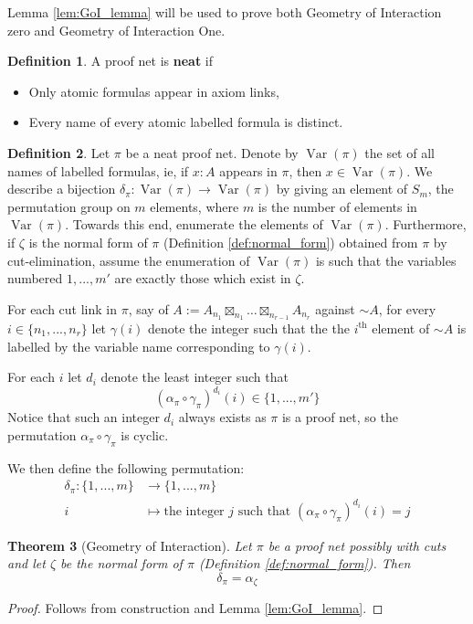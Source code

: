 \documentclass[12pt]{article}
\theoremstyle{plain}
\newtheorem{thm}{Theorem}[subsection] %
\theoremstyle{definition}
\newtheorem{defn}[thm]{Definition} %
\newcommand{\lto}{\longrightarrow}
\newcommand{\negation}{\sim}
\begin{document}
	Lemma \ref{lem:GoI_lemma} will be used to prove both Geometry of Interaction zero and Geometry of Interaction One.
	\begin{defn}
		A proof net is \textbf{neat} if
		\begin{itemize}
			\item Only atomic formulas appear in axiom links,
			\item Every name of every atomic labelled formula is distinct.
		\end{itemize}
	\end{defn}
	\begin{defn}\label{def:GoI_permutation}
		Let $\pi$ be a neat proof net. Denote by $\operatorname{Var}(\pi)$ the set of all names of labelled formulas, ie, if $x:A$ appears in $\pi$, then $x \in \operatorname{Var}(\pi)$. We describe a bijection $\delta_\pi: \operatorname{Var}(\pi) \lto \operatorname{Var}(\pi)$ by giving an element of $S_m$, the permutation group on $m$ elements, where $m$ is the number of elements in $\operatorname{Var}(\pi)$. Towards this end, enumerate the elements of $\operatorname{Var}(\pi)$. Furthermore, if $\zeta$ is the normal form of $\pi$ (Definition \ref{def:normal_form}) obtained from $\pi$ by cut-elimination, assume the enumeration of $\operatorname{Var}(\pi)$ is such that the variables numbered $1,...,m'$ are exactly those which exist in $\zeta$.
		
		For each cut link in $\pi$, say of $A := A_{n_1} \boxtimes_{n_1}\hdots \boxtimes_{n_{r-1}} A_{n_r}$ against $\negation A$, for every $i \in \lbrace n_1,...,n_r\rbrace$ let $\gamma(i)$ denote the integer such that the the $i^{\text{th}}$ element of $\negation A$ is labelled by the variable name corresponding to $\gamma(i)$.
		
		For each $i$ let $d_i$ denote the least integer such that 
		\begin{equation}
			(\alpha_{\pi} \circ \gamma_{\pi})^{d_i}(i) \in \lbrace 1,...,m'\rbrace    
		\end{equation}
		Notice that such an integer $d_i$ always exists as $\pi$ is a proof net, so the permutation $\alpha_{\pi} \circ \gamma_{\pi}$ is cyclic.
		
		We then define the following permutation:
		\begin{align*}
			\delta_{\pi}: \lbrace 1,...,m\rbrace &\lto \lbrace 1,...,m\rbrace\\
			i &\longmapsto \text{the integer }j\text{ such that } (\alpha_{\pi} \circ \gamma_{\pi})^{d_i}(i) = j
		\end{align*}
	\end{defn}
	\begin{thm}[Geometry of Interaction]
		Let $\pi$ be a proof net possibly with cuts and let $\zeta$ be the normal form of $\pi$ (Definition \ref{def:normal_form}). Then
		\begin{equation}
			\delta_\pi = \alpha_{\zeta}
		\end{equation}
	\end{thm}
	\begin{proof}
		Follows from construction and Lemma \ref{lem:GoI_lemma}.
	\end{proof}
\end{document}

